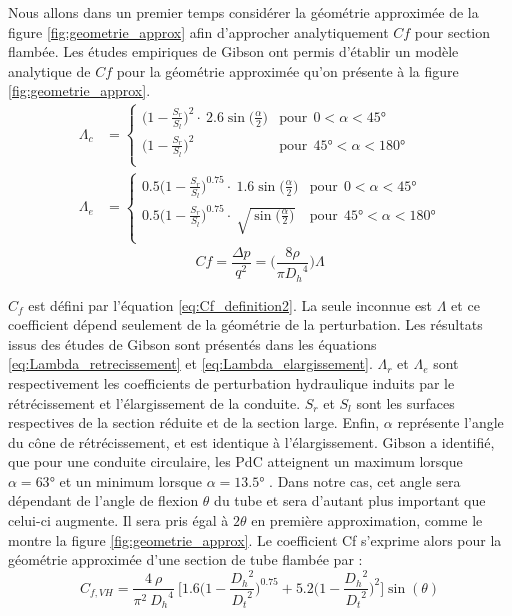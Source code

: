 Nous allons dans un premier temps considérer la géométrie approximée de la figure \ref{fig:geometrie_approx} afin d'approcher analytiquement $Cf$ pour section flambée. Les études empiriques de Gibson ont permis d'établir un modèle analytique de $Cf$ pour la géométrie approximée qu'on présente à la figure \ref{fig:geometrie_approx}\cite{Gibson1910, Idelcik1986, CRANECO1982}.
\begin{align}
\Lambda _ c & = 
    \begin{cases}
	\biggl(1-\frac{S_r}{S_l}\biggr)^2\cdot\ 2.6\sin\biggl(\frac{\alpha}{2}\biggr) & \text{pour} ~~0<\alpha<\ang{45} \\
	\biggl(1-\frac{S_r}{S_l}\biggr)^2 & \text{pour}~~\ang{45}<\alpha<\ang{180} \\
    \end{cases}
\label{eq:Lambda_retrecissement}\\
\Lambda _ e & = 
    \begin{cases}
	0.5\biggl(1-\frac{S_r}{S_l}\biggr)^{0.75}\cdot\ 1.6\sin\biggl(  \frac{\alpha}{2}\biggr) & \text{pour} ~~0<\alpha<\ang{45} \\
	0.5\biggl(1-\frac{S_r}{S_l}\biggr)^{0.75}\cdot\ \sqrt{\sin\biggl(  \frac{\alpha}{2}\biggr)} & \text{pour}~~\ang{45}<\alpha<\ang{180} \\
    \end{cases}
\label{eq:Lambda_elargissement}
\end{align} 
\begin{equation}
Cf = \frac{\Delta p}{q^2} = \biggl(\frac{8\rho}{\pi {D_h}^4}\biggr)\Lambda
\label{eq:Cf_definition2}
\end{equation}	

$C_f$ est défini par l'équation \ref{eq:Cf_definition2}. La seule inconnue est $\Lambda$ et ce coefficient dépend seulement de la géométrie de la perturbation. Les résultats issus des études de Gibson sont présentés dans les équations \ref{eq:Lambda_retrecissement} et \ref{eq:Lambda_elargissement}. $\Lambda_r$ et $\Lambda_e$ sont respectivement les coefficients de perturbation hydraulique induits par le rétrécissement et l'élargissement de la conduite. ${S_r}$ et ${S_l}$ sont les surfaces respectives de la section réduite et de la section large. Enfin, $\alpha$ représente l'angle du cône de rétrécissement, et est identique à l'élargissement. Gibson a identifié, que pour une conduite circulaire, les PdC atteignent un maximum lorsque $\alpha=\ang{63}$ et un minimum lorsque $\alpha=\ang{13.5}$ \cite{Gibson1910}. Dans notre cas, cet angle sera dépendant de l'angle de flexion $\theta$ du tube et sera d'autant plus important que celui-ci augmente. Il sera pris égal à $2\theta$ en première approximation, comme le montre la figure \ref{fig:geometrie_approx}. Le coefficient Cf s'exprime alors pour la géométrie approximée d'une section de tube flambée par :
\begin{equation}
C_{f,VH}  = 
	\frac{4\ \rho}{\pi^2\ {D_h}^4}\ 
\Biggl[ 1.6\biggl(1-\frac{{D_h}^2}{{D_t}^2}\biggr)^{0.75} + 
		5.2\biggl(1-\frac{{D_h}^2}{{D_t}^2}\biggr)^{2} 
\Biggr] \sin(\theta)
\label{eq:Cf_Gibson_45deg}
\end{equation} 
